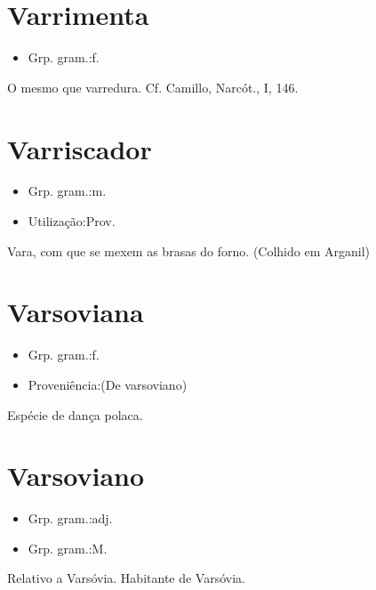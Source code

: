 \documentclass{article}
\begin{document}
\section{Varrimenta}
\begin{itemize}
\item {Grp. gram.:f.}
\end{itemize}
O mesmo que \textunderscore varredura\textunderscore . Cf. Camillo, \textunderscore Narcót.\textunderscore , I, 146.
\section{Varriscador}
\begin{itemize}
\item {Grp. gram.:m.}
\end{itemize}
\begin{itemize}
\item {Utilização:Prov.}
\end{itemize}
Vara, com que se mexem as brasas do forno. (Colhido em Arganil)
\section{Varsoviana}
\begin{itemize}
\item {Grp. gram.:f.}
\end{itemize}
\begin{itemize}
\item {Proveniência:(De \textunderscore varsoviano\textunderscore )}
\end{itemize}
Espécie de dança polaca.
\section{Varsoviano}
\begin{itemize}
\item {Grp. gram.:adj.}
\end{itemize}
\begin{itemize}
\item {Grp. gram.:M.}
\end{itemize}
Relativo a Varsóvia.
Habitante de Varsóvia.
\end{document}
